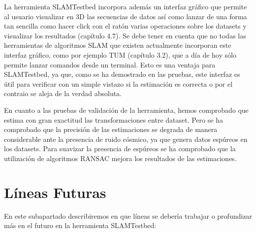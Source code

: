 La herramienta SLAMTestbed incorpora además un interfaz gráfico que permite al usuario visualizar en 3D las secuencias de datos así como lanzar de una forma tan sencilla como hacer click con el ratón varias operaciones sobre los datasets y visualizar los resultados (capítulo 4.7). Se debe tener en cuenta que no todas las herramientas de algoritmos SLAM que existen actualmente incorporan este interfaz gráfico, como por ejemplo TUM (capítulo 3.2), que a día de hoy sólo permite lanzar comandos desde un terminal. Esto es una ventaja para SLAMTestbed, ya que, como se ha demostrado en las pruebas, este interfaz es útil para verificar con un simple vistazo si la estimación es correcta o por el contraio se aleja de la verdad absoluta.

En cuanto a las pruebas de validación de la herramienta, hemos comprobado que estima con gran exactitud las transformaciones entre dataset. Pero se ha comprobado que la precisión de las estimaciones se degrada de manera considerable ante la presencia de ruido cósmico, ya que genera datos espúreos en los datasets. Para suavizar la presencia de espúreos se ha comprobado que la utilización de algoritmos RANSAC mejora los resultados de las estimaciones.


\section{Líneas Futuras}

En este subapartado describiremos en que líneas se debería trabajar o profundizar más en el futuro en la herramienta SLAMTestbed:

